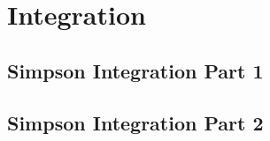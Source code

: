 \chapter{Integration}


\section{Simpson Integration Part 1}



\section{Simpson Integration Part 2}







